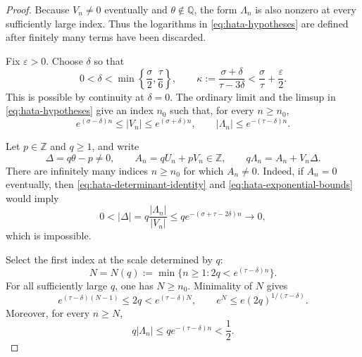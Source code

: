 \documentclass[10pt,a4paper]{amsart}
\begin{document}
\begin{proof}
Because \(V_n\ne0\) eventually and \(\theta\notin\mathbb Q\), the form
\(\Lambda_n\) is also nonzero at every sufficiently large index.  Thus
the logarithms in \eqref{eq:hata-hypotheses} are defined after finitely
many terms have been discarded.

Fix \(\varepsilon>0\).  Choose \(\delta\) so that
\begin{equation}\label{eq:hata-delta-choice}
 0<\delta<\min\left\{\frac\sigma2,\frac\tau6\right\},
 \qquad
 \kappa:=\frac{\sigma+\delta}{\tau-3\delta}
 <\frac\sigma\tau+\frac\varepsilon2.
\end{equation}
This is possible by continuity at \(\delta=0\).  The ordinary limit and
the limsup in \eqref{eq:hata-hypotheses} give an index \(n_0\) such that,
for every \(n\geq n_0\),
\begin{equation}\label{eq:hata-exponential-bounds}
 e^{(\sigma-\delta)n}\leq|V_n|
 \leq e^{(\sigma+\delta)n},
 \qquad
 |\Lambda_n|\leq e^{-(\tau-\delta)n}.
\end{equation}

Let \(p\in\mathbb Z\) and \(q\geq1\), and write
\begin{equation}\label{eq:hata-determinant-identity}
 \Delta=q\theta-p\ne0,
 \qquad A_n=qU_n+pV_n\in\mathbb Z,
 \qquad q\Lambda_n=A_n+V_n\Delta.
\end{equation}
There are infinitely many indices \(n\geq n_0\) for which \(A_n\ne0\).
Indeed, if \(A_n=0\) eventually, then \eqref{eq:hata-determinant-identity}
and \eqref{eq:hata-exponential-bounds} would imply
\[
 0<|\Delta|=q\frac{|\Lambda_n|}{|V_n|}
 \leq q e^{-(\sigma+\tau-2\delta)n}\longrightarrow0,
\]
which is impossible.

Select the first index at the scale determined by \(q\):
\begin{equation}\label{eq:hata-first-index}
 N=N(q):=\min\{n\geq1:2q<e^{(\tau-\delta)n}\}.
\end{equation}
For all sufficiently large \(q\), one has \(N\geq n_0\).  Minimality
of \(N\) gives
\begin{equation}\label{eq:hata-first-index-size}
 e^{(\tau-\delta)(N-1)}\leq2q<e^{(\tau-\delta)N},
 \qquad
 e^N\leq e(2q)^{1/(\tau-\delta)}.
\end{equation}
Moreover, for every \(n\geq N\),
\begin{equation}\label{eq:hata-small-form-at-scale}
 q|\Lambda_n|\leq q e^{-(\tau-\delta)n}<\frac12.
\end{equation}


\end{proof}
\end{document}
